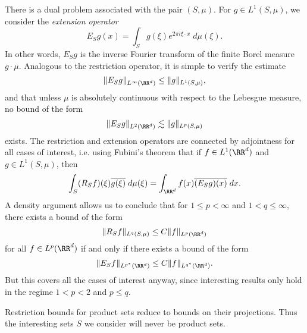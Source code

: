 There is a dual problem associated with the pair $(S,\mu)$. For $g \in L^1(S,\mu)$, we consider the \emph{extension operator}
%
\[ E_S g(x) = \int_S g(\xi) e^{2 \pi i \xi \cdot x}\; d\mu(\xi). \]
%
In other words, $E_S g$ is the inverse Fourier transform of the finite Borel measure $g \cdot \mu$. Analogous to the restriction operator, it is simple to verify the estimate
%
\[ \| E_S g \|_{L^\infty(\RR^d)} \leq \| g \|_{L^1(S,\mu)}, \]
%
and that unless $\mu$ is absolutely continuous with respect to the Lebesgue measure, no bound of the form
%
\[ \| E_S g \|_{L^2(\RR^d)} \lesssim \| g \|_{L^p(S,\mu)} \]
%
exists. The restriction and extension operators are connected by adjointness for all cases of interest, i.e. using Fubini's theorem that if $f \in L^1(\RR^d)$ and $g \in L^1(S,\mu)$, then
%
\[ \int_S (R_S f)(\xi) \overline{g(\xi)}\; d\mu(\xi) = \int_{\RR^d} f(x) \overline{(E_S g)(x)}\; dx. \]
%
A density argument allows us to conclude that for $1 \leq p < \infty$ and $1 < q \leq \infty$, there exists a bound of the form
%
\[ \| R_S f \|_{L^q(S,\mu)} \leq C \| f \|_{L^p(\RR^d)} \]
%
for all $f \in L^p(\RR^d)$ if and only if there exists a bound of the form
%
\[ \| E_S f \|_{L^{p^*}(\RR^d)} \leq C \| f \|_{L^{q^*}(\RR^d)}. \]
%
But this covers all the cases of interest anyway, since interesting results only hold in the regime $1 < p < 2$ and $p \leq q$.

Restriction bounds for product sets reduce to bounds on their projections. Thus the interesting sets $S$ we consider will never be product sets.

